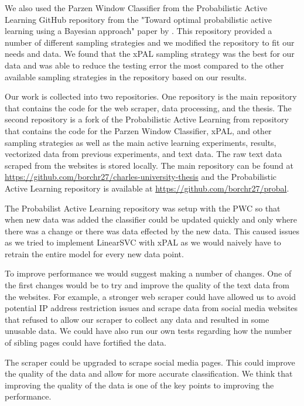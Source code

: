 We also used the Parzen Window Classifier from the Probabilistic Active Learning GitHub repository from the "Toward optimal probabilistic active learning using a Bayesian approach" paper by \cite{kottke2021toward}. This repository provided a number of different sampling strategies and we modified the repository to fit our needs and data. We found that the xPAL sampling strategy was the best for our data and was able to reduce the testing error the most compared to the other available sampling strategies in the repository based on our results.

Our work is collected into two repositories. One repository is the main repository that contains the code for the web scraper, data processing, and the thesis. The second repository is a fork of the Probabilistic Active Learning from \cite{kottke2021toward} repository that contains the code for the Parzen Window Classifier, xPAL, and other sampling strategies as well as the main active learning experiments, results, vectorized data from previous experiments, and text data. The raw text data scraped from the websites is stored locally. The main repository can be found at \url{https://github.com/borchr27/charles-university-thesis} and the Probabilistic Active Learning repository is available at \url{https://github.com/borchr27/probal}.

The Probabilist Active Learning repository was setup with the PWC so that when new data was added the classifier could be updated quickly and only where there was a change or there was data effected by the new data. This caused issues as we tried to implement LinearSVC with xPAL as we would naively have to retrain the entire model for every new data point.

To improve performance we would suggest making a number of changes. One of the first changes would be to try and improve the quality of the text data from the websites. For example, a stronger web scraper could have allowed us to avoid potential IP address restriction issues and scrape data from social media websites that refused to allow our scraper to collect any data and resulted in some unusable data. We could have also run our own tests regarding how the number of sibling pages could have fortified the data.

The scraper could be upgraded to scrape social media pages. This could improve the quality of the data and allow for more accurate classification. We think that improving the quality of the data is one of the key points to improving the performance.

